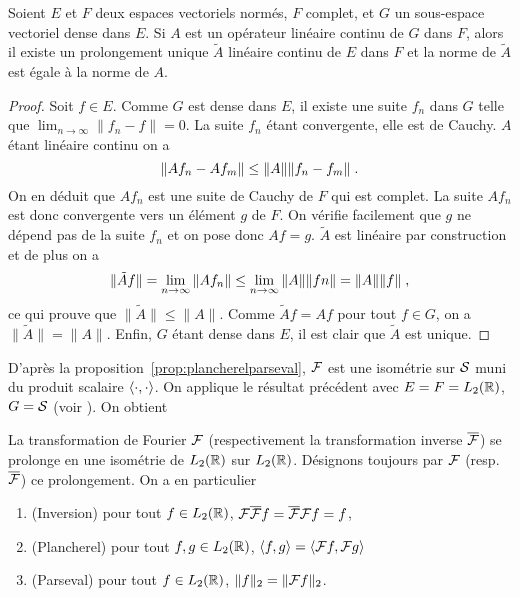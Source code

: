 \begin{proposition}
Soient $E$ et $F$ deux espaces vectoriels norm{\'e}s, $F$ complet, et $G$ un sous-espace vectoriel dense dans $E$.
Si $A$ est un op{\'e}rateur lin{\'e}aire continu de $G$ dans $F$, alors il existe un prolongement unique $\tilde{A}$
lin{\'e}aire continu de $E$ dans $F$ et la norme de $\tilde{A}$ est {\'e}gale {\`a} la norme de $A$.
\end{proposition}
\begin{proof}
Soit $f \in E$. Comme $G$ est dense dans $E$, il existe une suite $f_n$ dans $G$ telle que
$\lim_{n \to \infty} \| f_n - f \| = 0$. La suite $f_n$ {\'e}tant convergente, elle est de
Cauchy. $A$ {\'e}tant lin{\'e}aire continu on a
$$
\| A f_n- A f_m \| \leq \| A \| \| f_n- f_m \| \;.
$$
On en d{\'e}duit que $A f_n$ est une suite de Cauchy de $F$ qui est complet.
La suite $A f_n$ est donc convergente vers un {\'e}l{\'e}ment $g$ de $F$.
On v{\'e}rifie facilement que $g$ ne d{\'e}pend pas de la suite $f_n$ et on pose donc $A f = g$.
$\tilde{A}$ est lin{\'e}aire par construction et de plus on a
$$
\|  \tilde{A} f \| =  \lim_{n \to \infty} \| A f_n \| \leq \lim_{n \to \infty} \| A \| \| fn \| = \| A \| \| f \|\;,
$$
ce qui prouve que $\| \tilde{A} \| \leq  \| A \|$. Comme $\tilde{A} f = A f$ pour tout $f \in G$, on a $\| \tilde{A} \| = \| A \|$.
Enfin, $G$ {\'e}tant dense dans $E$, il est clair que $\tilde{A}$ est unique.
\end{proof}
D'apr{\`e}s la proposition~\ref{prop:plancherelparseval}, $\mathcal{F}$ est une isom{\'e}trie sur $\mathcal{S}$ muni du produit scalaire
$\left\langle \cdot, \cdot \right\rangle$. On applique le r{\'e}sultat pr{\'e}c{\'e}dent avec $E = F = L_2(\mathbb{R})$, $G = \mathcal{S}$ (voir ). On obtient
\begin{theorem}\label{thm:prolong}
La transformation de Fourier $\mathcal{F}$ (respectivement la transformation inverse $\overline{\mathcal{F}}$)
se prolonge en une isom{\'e}trie de $L_2(\mathbb{R})$ sur $L_2(\mathbb{R})$.
D{\'e}signons toujours par $\mathcal{F}$ (resp. $\overline{\mathcal{F}}$) ce prolongement. On a en particulier
\begin{enumerate}
\item (Inversion) pour tout $f \in L_2(\mathbb{R})$, $\mathcal{F} \overline{\mathcal{F}} f = \overline{\mathcal{F}} \mathcal{F} f = f$,
\item (Plancherel) pour tout $f,g \in L_2(\mathbb{R})$, $\left\langle f, g \right\rangle = \left\langle \mathcal{F} f, \mathcal{F} g \right\rangle$
\item (Parseval) pour tout $f \in L_2(\mathbb{R})$, $\| f \|_2 = \| \mathcal{F} f \|_2$.
\end{enumerate}
\end{theorem}

